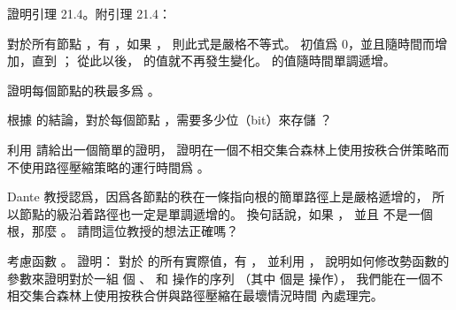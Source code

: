 \startsection[
  title={Analysis of union by rank with path compression},
]

\startEXERCISE
證明引理 21.4。附引理 21.4：

對於所有節點 ，有 ，如果 ，
則此式是嚴格不等式。  初值爲 0，並且隨時間而增加，直到 ；
從此以後，  的值就不再發生變化。
  的值隨時間單調遞增。
\stopEXERCISE

\startANSWER
{}
\stopANSWER

\startEXERCISE[exercise:21.4-2]
證明每個節點的秩最多爲 。
\stopEXERCISE

\startANSWER
{}
\stopANSWER

\startEXERCISE
根據 的結論，對於每個節點 ，需要多少位（bit）來存儲 ？
\stopEXERCISE

\startANSWER
{}
\stopANSWER

\startEXERCISE
利用 請給出一個簡單的證明，
證明在一個不相交集合森林上使用按秩合併策略而不使用路徑壓縮策略的運行時間爲 。
\stopEXERCISE

\startANSWER
{}
\stopANSWER

\startEXERCISE
Dante 教授認爲，因爲各節點的秩在一條指向根的簡單路徑上是嚴格遞增的，
所以節點的級沿着路徑也一定是單調遞增的。
換句話說，如果 ，
並且  不是一個根，那麼 。
請問這位教授的想法正確嗎？
\stopEXERCISE

\startANSWER
{}
\stopANSWER

\startEXERCISE\DIFFICULT
考慮函數 。
證明：
對於  的所有實際值，有 ，
並利用 ，
說明如何修改勢函數的參數來證明對於一組  個 、  和  操作的序列
（其中  個是  操作），
我們能在一個不相交集合森林上使用按秩合併與路徑壓縮在最壞情況時間  內處理完。
\stopEXERCISE

\startANSWER
{}
\stopANSWER

\stopsection
